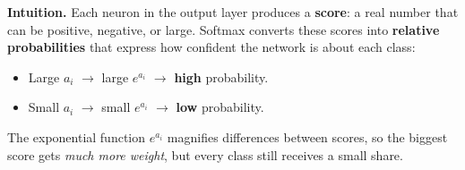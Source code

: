 \highspace
\textcolor{Green3}{ \textbf{Intuition.}} Each neuron in the output layer produces a \textbf{score}: a real number that can be positive, negative, or large. Softmax converts these scores into \textbf{relative probabilities} that express how confident the network is about each class:
\begin{itemize}
    \item Large $a_i$ $\rightarrow$ large $e^{a_i}$ $\rightarrow$ \textbf{high} probability.
    \item Small $a_i$ $\rightarrow$ small $e^{a_i}$ $\rightarrow$ \textbf{low} probability.
\end{itemize}
The exponential function $e^{a_i}$ magnifies differences between scores, so the biggest score gets \emph{much more weight}, but every class still receives a small share.

